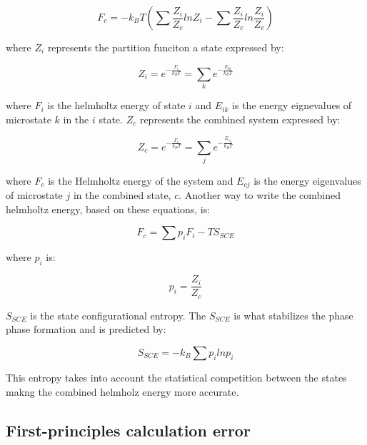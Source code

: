 \begin{equation}
\label{eq: combinedhelmholtz}
F_{c} = - k_{B} T \left( \sum \frac{Z_{i}}{Z_{c}} lnZ_{i} - \sum \frac{Z_{i}}{Z_{c}} ln \frac{Z_{i}}{Z_{c}}  \right) 
\end{equation}

\noindent where $Z_{i}$ represents the partition funciton a state expressed by:

\begin{equation}
\label{eq: zi}
Z_{i} = e^{- \frac{F_{i}}{k_{B}T}} = \sum_{k} e^{- \frac{E_{ik}}{k_{B}T}}
\end{equation}

where $F_{i}$ is the helmholtz energy of state $i$ and $E_{ik}$ is the energy eignevalues of microstate $k$ in the $i$ state. $Z_{c}$ represents the combined system expressed by:

\begin{equation}
\label{eq: zc}
Z_{c} = e^{-\frac{F_{c}}{k_{B}T}} = \sum_{j} e^{- \frac{E_{cj}}{k_{B}T}} 
\end{equation}

where $F_{c}$ is the Helmholtz energy of the system and $E_{cj}$ is the energy eigenvalues of microstate $j$ in the combined state, $c$. Another way to write the combined helmholtz energy, based on these equations, is:

\begin{equation}
\label{eq: combinedhelmholtz2}
F_{c} = \sum p_{i} F_{i} - TS_{SCE}
\end{equation}

\noindent where $p_{i}$ is:

\begin{equation}
\label{pi}
p_{i} = \frac{Z_{i}}{Z_{c}}
\end{equation}

\noindent $S_{SCE}$ is the state configurational entropy. The $S_{SCE}$ is what stabilizes the phase phase formation and is predicted by:

\begin{equation}
\label{SSCE}
S_{SCE} = -k_{B} \sum p_{i} lnp_{i}
\end{equation}

\noindent This entropy takes into account the statistical competition between the states makng the combined helmholz energy more accurate. 

\subsection{First-principles calculation error}

